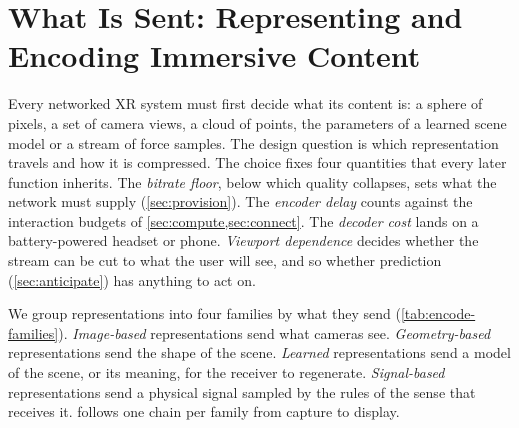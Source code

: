\section{What Is Sent: Representing and Encoding Immersive Content}\label{sec:encode}

Every networked XR system must first decide what its content is: a sphere of pixels, a set of camera
views, a cloud of points, the parameters of a learned scene model or a stream of force samples. The
design question is which representation travels and how it is compressed. The choice fixes four
quantities that every later function inherits. The \emph{bitrate floor},
below which quality collapses, sets what the network must supply (\cref{sec:provision}). The
\emph{encoder delay} counts against the interaction budgets of \cref{sec:compute,sec:connect}. The
\emph{decoder cost} lands on a battery-powered headset or phone. \emph{Viewport dependence} decides
whether the stream can be cut to what the user will see, and so whether prediction
(\cref{sec:anticipate}) has anything to act on.

We group representations into four families by what they send (\cref{tab:encode-families}).
\emph{Image-based} representations send what cameras see. \emph{Geometry-based} representations send
the shape of the scene. \emph{Learned} representations send a model of the scene, or its meaning, for
the receiver to regenerate. \emph{Signal-based} representations send a physical signal sampled by the
rules of the sense that receives it.  follows one chain per family from capture
to display.

